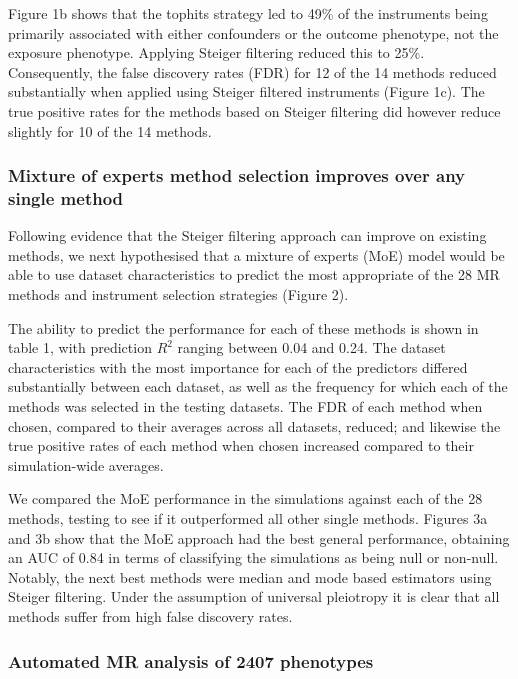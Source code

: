 \documentclass[]{article}
\begin{document}
Figure 1b shows that the tophits strategy led to 49\% of the instruments
being primarily associated with either confounders or the outcome
phenotype, not the exposure phenotype. Applying Steiger filtering
reduced this to 25\%. Consequently, the false discovery rates (FDR) for
12 of the 14 methods reduced substantially when applied using Steiger
filtered instruments (Figure 1c). The true positive rates for the
methods based on Steiger filtering did however reduce slightly for 10 of
the 14 methods.

\subsubsection{Mixture of experts method selection improves over any
single
method}\label{mixture-of-experts-method-selection-improves-over-any-single-method}

Following evidence that the Steiger filtering approach can improve on
existing methods, we next hypothesised that a mixture of experts (MoE)
model would be able to use dataset characteristics to predict the most
appropriate of the 28 MR methods and instrument selection strategies
(Figure 2).

The ability to predict the performance for each of these methods is
shown in table 1, with prediction \(R^2\) ranging between 0.04 and 0.24.
The dataset characteristics with the most importance for each of the
predictors differed substantially between each dataset, as well as the
frequency for which each of the methods was selected in the testing
datasets. The FDR of each method when chosen, compared to their averages
across all datasets, reduced; and likewise the true positive rates of
each method when chosen increased compared to their simulation-wide
averages.

We compared the MoE performance in the simulations against each of the
28 methods, testing to see if it outperformed all other single methods.
Figures 3a and 3b show that the MoE approach had the best general
performance, obtaining an AUC of 0.84 in terms of classifying the
simulations as being null or non-null. Notably, the next best methods
were median and mode based estimators using Steiger filtering. Under the
assumption of universal pleiotropy it is clear that all methods suffer
from high false discovery rates.

\subsubsection{Automated MR analysis of 2407
phenotypes}\label{automated-mr-analysis-of-2407-phenotypes}
\end{document}
